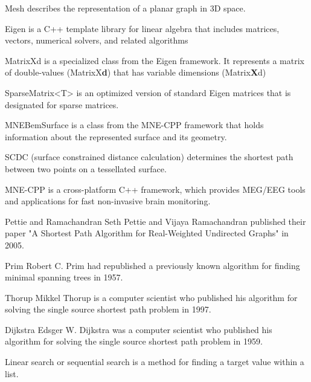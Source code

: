 \begin{aims}
	
	\item[Mesh] describes the representation of a planar graph in 3D space.
	\item[Eigen] is a C++ template library for linear algebra that includes matrices, vectors, numerical solvers, and related algorithms
	\item[MatrixXd] is a specialized class from the Eigen framework. It represents a matrix of double-values (MatrixX\textbf{d}) that has variable dimensions (Matrix\textbf{X}d)
	\item[SparseMatrix<T>] is an optimized version of standard Eigen matrices that is designated for sparse matrices.
	\item[MNEBemSurface] is a class from the MNE-CPP framework that holds information about the represented surface and its geometry.
	\item [SCDC] (surface constrained distance calculation) determines the shortest path between two points on a tessellated surface.
	\item [MNE-CPP] is a cross-platform C++ framework, which provides MEG/EEG tools and applications for fast non-invasive brain monitoring.
	\item[Pettie and Ramachandran] Seth Pettie and Vijaya Ramachandran published their paper "A Shortest Path Algorithm for Real-Weighted Undirected Graphs" in 2005.
	\item[Prim] Robert C. Prim had republished a previously known algorithm for finding minimal spanning trees in 1957.
	\item[Thorup] Mikkel Thorup is a computer scientist who published his algorithm for solving the single source shortest path problem in 1997.
	\item[Dijkstra] Edsger W. Dijkstra was a computer scientist who published his algorithm for solving the single source shortest path problem in 1959.
	\item [Linear search] or sequential search is a method for finding a target value within a list.
\end{aims}

  

